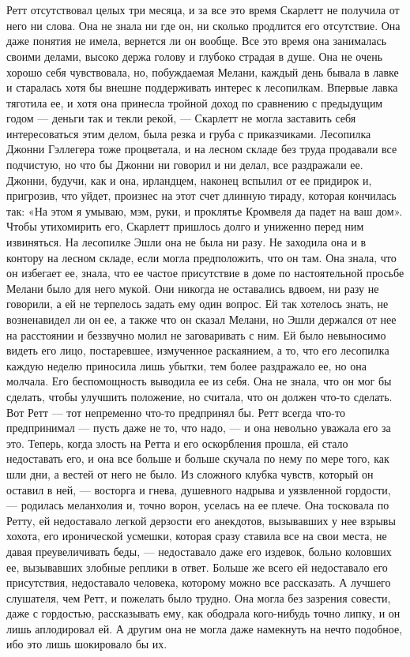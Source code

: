 \chapter{\ }

Ретт отсутствовал целых три месяца, и за все это время Скарлетт не получила от него ни слова. Она не знала ни где он, ни сколько продлится его отсутствие. Она даже понятия не имела, вернется ли он вообще. Все это время она занималась своими делами, высоко держа голову и глубоко страдая в душе. Она не очень хорошо себя чувствовала, но, побуждаемая Мелани, каждый день бывала в лавке и старалась хотя бы внешне поддерживать интерес к лесопилкам. Впервые лавка тяготила ее, и хотя она принесла тройной доход по сравнению с предыдущим годом — деньги так и текли рекой, — Скарлетт не могла заставить себя интересоваться этим делом, была резка и груба с приказчиками. Лесопилка Джонни Гэллегера тоже процветала, и на лесном складе без труда продавали все подчистую, но что бы Джонни ни говорил и ни делал, все раздражали ее. Джонни, будучи, как и она, ирландцем, наконец вспылил от ее придирок и, пригрозив, что уйдет, произнес на этот счет длинную тираду, которая кончилась так: «На этом я умываю, мэм, руки, и проклятье Кромвеля да падет на ваш дом». Чтобы утихомирить его, Скарлетт пришлось долго и униженно перед ним извиняться.
На лесопилке Эшли она не была ни разу. Не заходила она и в контору на лесном складе, если могла предположить, что он там. Она знала, что он избегает ее, знала, что ее частое присутствие в доме по настоятельной просьбе Мелани было для него мукой. Они никогда не оставались вдвоем, ни разу не говорили, а ей не терпелось задать ему один вопрос. Ей так хотелось знать, не возненавидел ли он ее, а также что он сказал Мелани, но Эшли держался от нее на расстоянии и беззвучно молил не заговаривать с ним. Ей было невыносимо видеть его лицо, постаревшее, измученное раскаянием, а то, что его лесопилка каждую неделю приносила лишь убытки, тем более раздражало ее, но она молчала.
Его беспомощность выводила ее из себя. Она не знала, что он мог бы сделать, чтобы улучшить положение, но считала, что он должен что-то сделать. Вот Ретт — тот непременно что-то предпринял бы. Ретт всегда что-то предпринимал — пусть даже не то, что надо, — и она невольно уважала его за это.
Теперь, когда злость на Ретта и его оскорбления прошла, ей стало недоставать его, и она все больше и больше скучала по нему по мере того, как шли дни, а вестей от него не было. Из сложного клубка чувств, который он оставил в ней, — восторга и гнева, душевного надрыва и уязвленной гордости, — родилась меланхолия и, точно ворон, уселась на ее плече. Она тосковала по Ретту, ей недоставало легкой дерзости его анекдотов, вызывавших у нее взрывы хохота, его иронической усмешки, которая сразу ставила все на свои места, не давая преувеличивать беды, — недоставало даже его издевок, больно коловших ее, вызывавших злобные реплики в ответ. Больше же всего ей недоставало его присутствия, недоставало человека, которому можно все рассказать. А лучшего слушателя, чем Ретт, и пожелать было трудно. Она могла без зазрения совести, даже с гордостью, рассказывать ему, как ободрала кого-нибудь точно липку, и он лишь аплодировал ей. А другим она не могла даже намекнуть на нечто подобное, ибо это лишь шокировало бы их.
